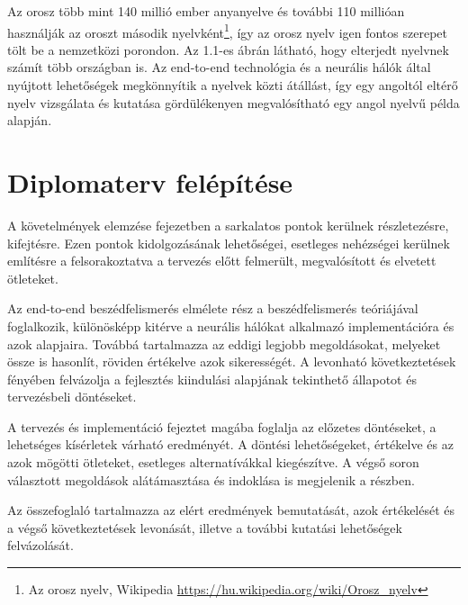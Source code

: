 Az orosz több mint 140 millió ember anyanyelve és további 110 millióan használják az oroszt második nyelvként\footnote{Az orosz nyelv, Wikipedia \url{https://hu.wikipedia.org/wiki/Orosz_nyelv}}, így az orosz nyelv igen fontos szerepet tölt be a nemzetközi porondon. Az 1.1-es ábrán látható, hogy elterjedt nyelvnek számít több országban is. Az end-to-end technológia és a neurális hálók által nyújtott lehetőségek megkönnyítik a nyelvek közti átállást, így egy angoltól eltérő nyelv vizsgálata és kutatása gördülékenyen megvalósítható egy angol nyelvű példa alapján.

\section{Diplomaterv felépítése}

A követelmények elemzése fejezetben a sarkalatos pontok kerülnek részletezésre, kifejtésre. Ezen pontok kidolgozásának lehetőségei, esetleges nehézségei kerülnek említésre a felsorakoztatva a tervezés előtt felmerült, megvalósított és elvetett ötleteket.

Az end-to-end beszédfelismerés elmélete rész a beszédfelismerés teóriájával foglalkozik, különösképp kitérve a neurális hálókat alkalmazó implementációra és azok alapjaira. Továbbá tartalmazza az eddigi legjobb megoldásokat, melyeket össze is hasonlít, röviden értékelve azok sikerességét. A levonható következtetések fényében felvázolja a fejlesztés kiindulási alapjának tekinthető állapotot és tervezésbeli döntéseket.

A tervezés és implementáció fejeztet magába foglalja az előzetes döntéseket, a lehetséges kísérletek várható eredményét. A döntési lehetőségeket, értékelve és az azok mögötti ötleteket, esetleges alternatívákkal kiegészítve. A végső soron választott megoldások alátámasztása és indoklása is megjelenik a részben.

Az összefoglaló tartalmazza az elért eredmények bemutatását, azok értékelését és a végső következtetések levonását, illetve a további kutatási lehetőségek felvázolását.